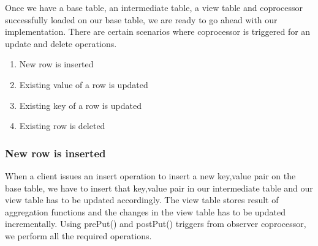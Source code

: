 \documentclass[11pt,a4paper,bibtotoc,idxtotoc,headsepline,footsepline,footexclude,BCOR12mm,DIV13]{scrbook}
\begin{document}

    

Once we have a base table, an intermediate table, a view table and coprocessor successfully loaded on our base table, we are ready to go ahead with our implementation. There are certain scenarios where coprocessor is triggered for an update and delete operations.

\begin{enumerate}
    \item New row is inserted
    \item Existing value of a row is updated
    \item Existing key of a row is updated
    \item Existing row is deleted
\end{enumerate}

\subsubsection{New row is inserted}
When a client issues an insert operation to insert a new key,value pair on the base table, we have to insert that key,value pair in our intermediate table and our view table has to be updated accordingly. The view table stores result of aggregation functions and the changes in the view table has to be updated incrementally. Using prePut() and postPut() triggers from observer coprocessor, we perform all the required operations.
\end{document}
